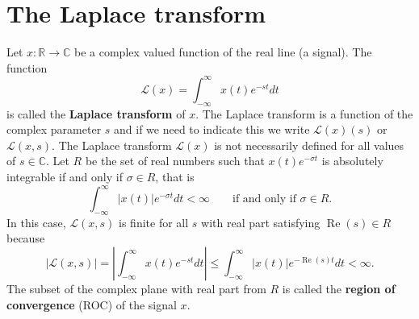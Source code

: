 \documentclass[11pt,a4paper]{book}
\theoremstyle{plain}
\numberwithin{equation}{section}
\newcommand{\reals}{{\mathbb R}}
\newcommand{\complex}{{\mathbb C}}
\renewcommand{\Re}{\operatorname{Re}}
\newcommand{\term}{\textbf}
\newcommand{\abs}[1]{\left\vert #1 \right\vert}
\newcommand{\sabs}[1]{\vert #1 \vert}
\begin{document}
\chapter{The Laplace transform} \label{sec:laplace-transform}

\newcommand*{\calL}{\mathcal L}


Let $x \colon \reals \to \complex$ be a complex valued function of the real line (a signal).  The function
\begin{equation}\label{eq:laplace_defn}
\calL(x) = \int_{-\infty}^{\infty} x(t) e^{-st} dt
\end{equation}
is called the \term{Laplace transform} of $x$.  The Laplace transform is a function of the complex parameter $s$ and if we need to indicate this we write $\calL(x)(s)$ or $\calL(x,s)$.  The Laplace transform $\calL(x)$ is not necessarily defined for all values of $s \in \complex$.  
Let $R$ be the set of real numbers such that $x(t) e^{-\sigma t}$ is absolutely integrable if and only if $\sigma \in R$, that is
\[
\int_{-\infty}^{\infty} \abs{x(t)} e^{-\sigma t} dt < \infty  \qquad \text{if and only if $\sigma \in R$}.
\]
In this case, $\calL(x,s)$ is finite for all $s$ with real part satisfying $\Re(s) \in R$ because 
\[
\sabs{\calL(x,s)} = \abs{\int_{-\infty}^{\infty} x(t) e^{-st} dt} \leq \int_{-\infty}^{\infty} \abs{x(t)} e^{-\Re(s) t} dt < \infty.
\]
The subset of the complex plane with real part from $R$ is called the \term{region of convergence} (ROC) of the signal $x$.  %
\end{document}
